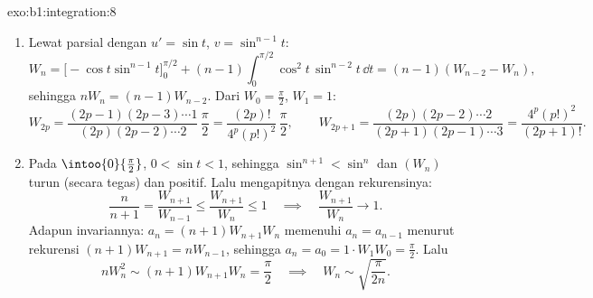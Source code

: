 \begin{solution}{exo:b1:integration:8}
\begin{enumerate}
  \item Lewat parsial dengan $u' = \sin t$, $v = \sin^{n-1} t$:
        \[
        W_n = \bigl[-\cos t\sin^{n-1}t\bigr]_0^{\pi/2}
        + (n-1)\int_0^{\pi/2} \cos^2 t\,\sin^{n-2} t\,\dd t
        = (n-1)(W_{n-2} - W_n),
        \]
        sehingga $nW_n = (n-1)W_{n-2}$. Dari $W_0 = \frac\pi2$, $W_1 = 1$:
        \[
        W_{2p} = \frac{(2p-1)(2p-3)\cdots 1}{(2p)(2p-2)\cdots 2}\,
        \frac{\pi}{2} = \frac{(2p)!}{4^p (p!)^2}\,\frac\pi2,
        \qquad
        W_{2p+1} = \frac{(2p)(2p-2)\cdots 2}{(2p+1)(2p-1)\cdots 3}
        = \frac{4^p (p!)^2}{(2p+1)!} .
        \]
  \item Pada $\intoo{0}{\frac\pi2}$, $0 < \sin t < 1$, sehingga $\sin^{n+1} <
        \sin^n$ dan $(W_n)$ turun (secara tegas) dan positif.
        Lalu mengapitnya dengan rekurensinya:
        \[
        \frac{n}{n+1} = \frac{W_{n+1}}{W_{n-1}}
        \leq \frac{W_{n+1}}{W_n} \leq 1
        \quad\implies\quad \frac{W_{n+1}}{W_n} \to 1 .
        \]
        Adapun invariannya: $a_n = (n+1)W_{n+1}W_n$ memenuhi $a_n = a_{n-1}$
        menurut rekurensi $(n+1)W_{n+1} = nW_{n-1}$, sehingga $a_n = a_0 =
        1 \cdot W_1 W_0 = \frac\pi2$. Lalu
        \[
        n W_n^2 \sim (n+1) W_{n+1} W_n = \frac\pi2
        \quad\implies\quad
        W_n \sim \sqrt{\frac{\pi}{2n}} .
        \]
\end{enumerate}
\end{solution}

